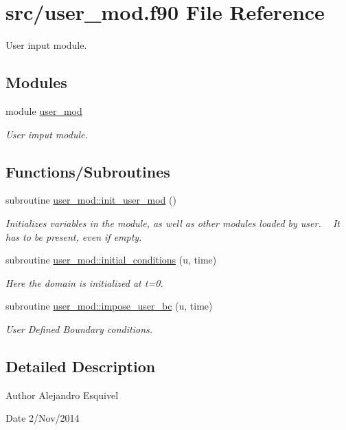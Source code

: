 \hypertarget{user__mod_8f90}{}\section{src/user\+\_\+mod.f90 File Reference}
\label{user__mod_8f90}


User input module.  


\subsection*{Modules}
\begin{DoxyCompactItemize}
\item 
module \hyperlink{namespaceuser__mod}{user\+\_\+mod}
\begin{DoxyCompactList}\small\item\em User imput module. \end{DoxyCompactList}\end{DoxyCompactItemize}
\subsection*{Functions/\+Subroutines}
\begin{DoxyCompactItemize}
\item 
\hypertarget{namespaceuser__mod_a302a8099e4696e80b634ec347d6a3bec}{}subroutine \hyperlink{namespaceuser__mod_a302a8099e4696e80b634ec347d6a3bec}{user\+\_\+mod\+::init\+\_\+user\+\_\+mod} ()\label{namespaceuser__mod_a302a8099e4696e80b634ec347d6a3bec}

\begin{DoxyCompactList}\small\item\em Initializes variables in the module, as well as other modules loaded by user. ~\newline
 It has to be present, even if empty. \end{DoxyCompactList}\item 
subroutine \hyperlink{namespaceuser__mod_af84e741a381f9d0caa55ccacc24d5244}{user\+\_\+mod\+::initial\+\_\+conditions} (u, time)
\begin{DoxyCompactList}\small\item\em Here the domain is initialized at t=0. \end{DoxyCompactList}\item 
subroutine \hyperlink{namespaceuser__mod_a6028f43a668931350eba8020d0466e4f}{user\+\_\+mod\+::impose\+\_\+user\+\_\+bc} (u, time)
\begin{DoxyCompactList}\small\item\em User Defined Boundary conditions. \end{DoxyCompactList}\end{DoxyCompactItemize}


\subsection{Detailed Description}
\begin{DoxyAuthor}{Author}
Alejandro Esquivel 
\end{DoxyAuthor}
\begin{DoxyDate}{Date}
2/\+Nov/2014 
\end{DoxyDate}
